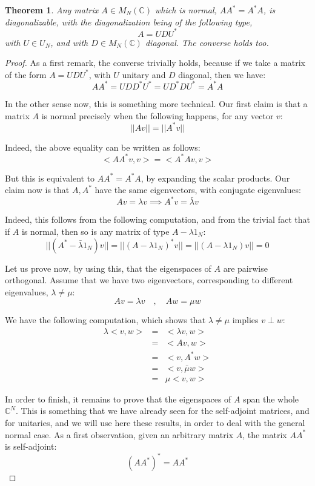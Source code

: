 \documentclass[12pt]{amsbook}
\newtheorem{theorem}{Theorem}[chapter]
\begin{document}
\begin{theorem}
Any matrix $A\in M_N(\mathbb C)$ which is normal, $AA^*=A^*A$, is diagonalizable, with the diagonalization being of the following type,
$$A=UDU^*$$
with $U\in U_N$, and with $D\in M_N(\mathbb C)$ diagonal. The converse holds too.
\end{theorem}

\begin{proof}
As a first remark, the converse trivially holds, because if we take a matrix of the form $A=UDU^*$, with $U$ unitary and $D$ diagonal, then we have:
$$AA^*
=UDD^*U^*
=UD^*DU^*
=A^*A$$

In the other sense now, this is something more technical. Our first claim is that a matrix $A$ is normal precisely when the following happens, for any vector $v$:
$$||Av||=||A^*v||$$

Indeed, the above equality can be written as follows:
$$<AA^*v,v>=<A^*Av,v>$$

But this is equivalent to $AA^*=A^*A$, by expanding the scalar products. Our claim now is that $A,A^*$ have the same eigenvectors, with conjugate eigenvalues:
$$Av=\lambda v\implies A^*v=\bar{\lambda}v$$

Indeed, this follows from the following computation, and from the trivial fact that if $A$ is normal, then so is any matrix of type $A-\lambda 1_N$:
$$||(A^*-\bar{\lambda}1_N)v||
=||(A-\lambda 1_N)^*v||
=||(A-\lambda 1_N)v||
=0$$

Let us prove now, by using this, that the eigenspaces of $A$ are pairwise orthogonal. Assume that we have two eigenvectors, corresponding to different eigenvalues, $\lambda\neq\mu$:
$$Av=\lambda v\quad,\quad 
Aw=\mu w$$

We have the following computation, which shows that $\lambda\neq\mu$ implies $v\perp w$:
\begin{eqnarray*}
\lambda<v,w>
&=&<\lambda v,w>\\
&=&<Av,w>\\
&=&<v,A^*w>\\
&=&<v,\bar{\mu}w>\\
&=&\mu<v,w>
\end{eqnarray*}

In order to finish, it remains to prove that the eigenspaces of $A$ span the whole $\mathbb C^N$. This is something that we have already seen for the self-adjoint matrices, and for unitaries, and we will use here these results, in order to deal with the general normal case. As a first observation, given an arbitrary matrix $A$, the matrix $AA^*$ is self-adjoint:
$$(AA^*)^*=AA^*$$


\end{proof}
\end{document}
